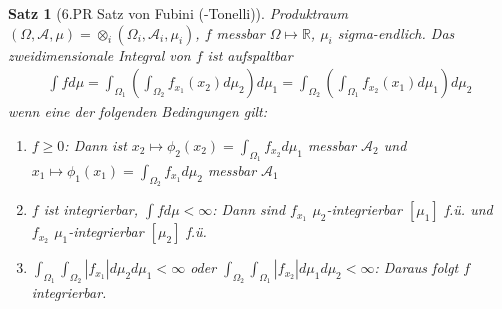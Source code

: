 \documentclass[]{article}
\newtheorem{theorem}{Satz}
\begin{document}
\begin{theorem}[6.PR Satz von Fubini (-Tonelli)]
	Produktraum $(\Omega,\mathcal{A}, \mu) = \otimes_i (\Omega_i, \mathcal{A}_i, \mu_i)$, $f$ messbar $\Omega \mapsto \mathbb{R}$, $\mu_i$ sigma-endlich.
	Das zweidimensionale Integral von $f$ ist aufspaltbar
	\begin{align*}
		\int f d\mu = \int_{\Omega_1}\left(\int_{\Omega_2}f_{x_1}(x_2) d\mu_2\right)d\mu_1 = \int_{\Omega_2}\left(\int_{\Omega_1}f_{x_2}(x_1) d\mu_1\right)d\mu_2
	\end{align*}
	wenn eine der folgenden Bedingungen gilt:
	\begin{enumerate}
		\item $f\geq 0$: Dann ist $x_2\mapsto \phi_2(x_2) = \int_{\Omega_1}f_{x_2}d\mu_1$ messbar $\mathcal{A}_2$ und $x_1\mapsto \phi_1(x_1) = \int_{\Omega_2}f_{x_1}d\mu_2$ messbar $\mathcal{A}_1$
		\item $f$ ist integrierbar, $\int f d\mu < \infty$: Dann sind $f_{x_1}$ $\mu_2$-integrierbar $[\mu_1]$ f.ü. und $f_{x_2}$ $\mu_1$-integrierbar $[\mu_2]$ f.ü.
		\item $\int_{\Omega_1}\int_{\Omega_2}|f_{x_1}|d\mu_2 d\mu_1 < \infty$ oder $\int_{\Omega_2}\int_{\Omega_1}|f_{x_2}|d\mu_1 d\mu_2 < \infty$: Daraus folgt $f$ integrierbar.
	\end{enumerate}
\end{theorem}
\end{document}
